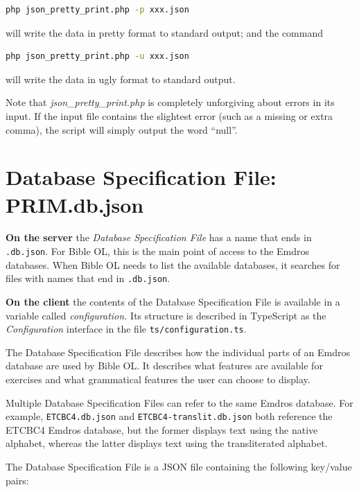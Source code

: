 \documentclass[11pt,oneside,a4paper]{memoir}
\begin{document}
\begin{lstlisting}[language=bash]
php json_pretty_print.php -p xxx.json
\end{lstlisting}

\noindent
will write the data in pretty format to standard output; and the command

\begin{lstlisting}[language=bash]
php json_pretty_print.php -u xxx.json
\end{lstlisting}

\noindent
will write the data in ugly format to standard output.

Note that \emph{json\_pretty\_print.php} is completely unforgiving about errors in its input. If the
input file contains the slightest error (such as a missing or extra comma), the script will
simply output the word ``null''.


\section{Database Specification File: PRIM.db.json}\label{sec-dsf}

\textbf{On the server} the \emph{Database Specification File} has a name that ends in \texttt{.db.json}. For Bible OL,
this is the main point of access to the Emdros databases. When Bible OL needs to list the available
databases, it searches for files with names that end in \texttt{.db.json}.

\textbf{On the client} the contents of the Database Specification File is available in a variable
called \emph{configuration.} Its structure is described in TypeScript as the \emph{Configuration}
interface in the file \texttt{ts/configuration.ts}.

The Database Specification File describes how the individual parts of an Emdros database are used by Bible
OL. It describes what features are available for exercises and what grammatical features the user
can choose to display.

Multiple Database Specification Files can refer to the same Emdros database. For example,
\texttt{ETCBC4.db.json} and \texttt{ETCBC4-translit.db.json} both reference the ETCBC4 Emdros
database, but the former displays text using the native alphabet, whereas the latter displays text
using the transliterated alphabet.

The Database Specification File is a JSON file containing the following key/value pairs:
\end{document}

